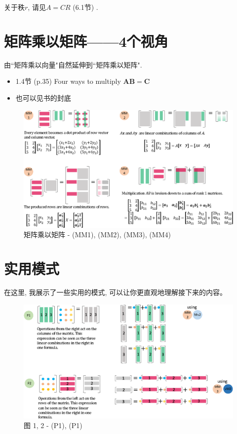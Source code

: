 \documentclass[letterpaper]{article}
\begin{document}
关于秩$r$, 请见$A=CR$ (6.1节) .


\section{矩阵乘以矩阵——4个视角}

由``矩阵乘以向量"自然延伸到``矩阵乘以矩阵".

\begin{itemize}
  \item 1.4节 (p.35) Four ways to multiply $\bm{AB=C}$
  \item 也可以见书的封底
\end{itemize} 


\begin{figure}[H]
  \centering
  \includegraphics[scale=0.8]{MatrixTimesMatrix.eps}
  \caption{矩阵乘以矩阵 - (MM1), (MM2), (MM3), (MM4)}
\end{figure}

\section{实用模式}

在这里, 我展示了一些实用的模式, 可以让你更直观地理解接下来的内容。

\begin{figure}[H]
  \centering
  \includegraphics[scale=0.8]{Pattern12.eps}
  \caption{图 1, 2 - (P1), (P1)}
\end{figure}
\end{document}
